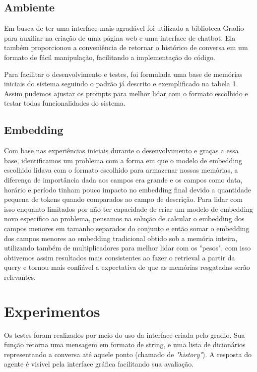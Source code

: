 \documentclass[conference]{IEEEtran}
\begin{document}
\subsection{Ambiente}
Em busca de ter uma interface mais agradável foi utilizado a biblioteca Gradio para auxiliar na criação de uma página web e uma interface de chatbot. Ela também proporcionou a conveniência de retornar o histórico de conversa em um formato de fácil manipulação, facilitando a implementação do código.

Para facilitar o desenvolvimento e testes, foi formulada uma base de memórias iniciais do sistema seguindo o padrão já descrito e exemplificado na tabela 1. Assim pudemos ajustar os prompts para melhor lidar com o formato escolhido e testar todas funcionalidades do sistema.

\subsection{Embedding}
Com base nas experiências iniciais durante o desenvolvimento e graças a essa base, identificamos um problema com a forma em que o modelo de embedding escolhido lidava com o formato escolhido para armazenar nossas memórias, a diferença de importância dada aos campos era grande e os campos como data, horário e período tinham pouco impacto no embedding final devido a quantidade pequena de tokens quando comparados ao campo de descrição. Para lidar com isso enquanto limitados por não ter capacidade de criar um modelo de embedding novo específico ao problema, pensamos na solução de calcular o embedding dos campos menores em tamanho separados do conjunto e então somar o embedding dos campos menores ao embedding tradicional obtido sob a memória inteira, utilizando também de multiplicadores para melhor lidar com os "pesos", com isso obtivemos assim resultados mais consistentes ao fazer o retrieval a partir da query e tornou mais confiável a expectativa de que as memórias resgatadas serão relevantes.

\section{Experimentos}

Os testes foram realizados por meio do uso da interface criada pelo gradio. Sua função retorna uma mensagem em formato de string, e uma lista de dicionários representando a conversa até aquele ponto (chamado de \textit{"history"}). A resposta do agente é visível pela interface gráfica facilitando sua avaliação.
\end{document}
